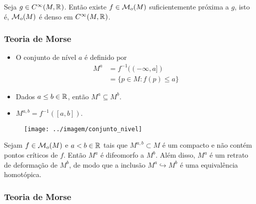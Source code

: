 \documentclass{beamer}
\begin{document}
\begin{footnotesize}
\begin{frame}
		\begin{teorema}
			Seja $g\in C^{\infty}(M, \mathbb{R}^{})$. Então existe $f \in \mathcal{M}_{o}(M)$ suficientemente próxima a $g$, isto é, $\mathcal{M}_{o}(M)$ é denso em $C^{\infty}(M, \mathbb{R}^{})$.
		\end{teorema}
	\end{frame}
	
	\begin{frame}
	
	\frametitle{Teoria de Morse}
		
			
			\begin{minipage}[t]{0.5\linewidth}
				\begin{itemize}
					\item O conjunto de nível $a$ é definido por
					$$
					\begin{aligned}
					M^{a}&= f^{-1}((-\infty, a]) 
					\\
					&= \{p \in M: f(p)\leq a\}
					\end{aligned}
					$$
					
					\item Dados $a\leq b \in \mathbb{R}^{}$, então $M^{a} \subseteq M^{b}$.
					
					\item $M^{a,b} = f^{-1}([a,b])$.
				\end{itemize}
			\end{minipage}
			\hfill%
			\begin{minipage}[t]{0.48\linewidth}
				\begin{figure}
					\centering
					\textbf{}\par
					\texttt{[image: ../imagem/conjunto\_nivel]}
				\end{figure}
				
			\end{minipage}
			
			\begin{teorema}
				Sejam $f \in \mathcal{M}_{o}(M)$ e $a<b \in \mathbb{R}^{}$ tais que $M^{a,b}\subset M$ é um compacto e não contém pontos críticos de $f$. Então $M^{a}$ é difeomorfo a $M^{b}$. Além disso, $M^{a}$ é um retrato de deformação de $M^{b}$, de modo que a inclusão  $M^{a} \hookrightarrow M^{b}$ é uma equivalência homotópica.
			\end{teorema}
			
	\end{frame}
	
	\begin{frame}
		\frametitle{Teoria de Morse}
	

\end{frame}
\end{footnotesize}
\end{document}
